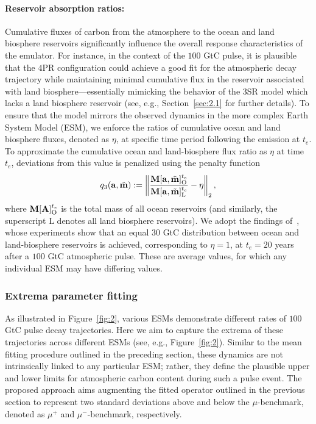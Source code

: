 \documentclass[11pt, a4paper, pdftex, twoside, dvipsnames]{article}
\renewcommand{\ref}{\cref}
\newcommand{\bb}[1]{\boldsymbol{\bold{#1}}}
\newcommand{\bbt}[1]{\tilde{\boldsymbol{\mathrm{#1}}}}
\newcommand{\ameq}[0]{\bb{a},\bbt{m}}
\begin{document}
\paragraph{Reservoir absorption ratios:}
Cumulative fluxes of carbon from the atmosphere to the ocean and land biosphere reservoirs significantly influence the overall response characteristics of the emulator. 
%
For instance, in the context of the $100$ GtC pulse, it is plausible that the $4$PR configuration could achieve a good fit for the atmospheric decay trajectory while maintaining minimal cumulative flux in the reservoir associated with land biosphere---essentially mimicking the behavior of the $3$SR model which lacks a land biosphere reservoir (see, e.g., Section~\ref{sec:2.1} for further details).
%
To ensure that the model mirrors the observed dynamics in the more complex Earth System Model (ESM), we enforce the ratios of cumulative ocean and land biosphere fluxes, denoted as $\eta$, at specific time period following the emission at $t_e$.
%
To approximate the cumulative ocean and land-biosphere flux ratio as $\eta$ at time $t_e$, deviations from this value is penalized using the penalty function
%
\begin{align}\label{eq:q3}
	q_3(\ameq) := \left \| \frac{  
	\bb{M}[ \ameq ]_{\text{O}}^{t_e}
	}{
	\bb{M}[ \ameq]_{\text{L}}^{t_e}} - \eta \right \|_2,
\end{align}
%
where $\bb{M}[\bb{A}]^{t_e}_{\text{O}}$ is the total mass of all ocean reservoirs (and similarly, the superscript $\text{L}$ denotes all land biosphere reservoirs).
%
We adopt the findings of~\cite{joos2013carbon}, whose experiments show that an equal $30$ GtC distribution between ocean and land-biosphere reservoirs is achieved, corresponding to $\eta = 1$, at $t_e = 20$ years after a $100$ GtC atmospheric pulse.
%
These are average values, for which any individual ESM may have differing values.


\subsubsection{Extrema parameter fitting} \label{sec:2.2.2}
As illustrated in Figure~\ref{fig:2}, various ESMs demonstrate different rates of $100$ GtC pulse decay trajectories. 
%
Here we aim to capture the extrema of these trajectories across different ESMs (see, e.g., Figure~\ref{fig:2}).
%
Similar to the mean fitting procedure outlined in the preceding section, these dynamics are not intrinsically linked to any particular ESM; rather, they define the plausible upper and lower limits for atmospheric carbon content during such a pulse event.
%
The proposed approach aims augmenting the fitted operator outlined in the previous section to represent two standard deviations above and below the $\mu$-benchmark, denoted as $\mu^+$ and $\mu^-$-benchmark, respectively.
\end{document}
